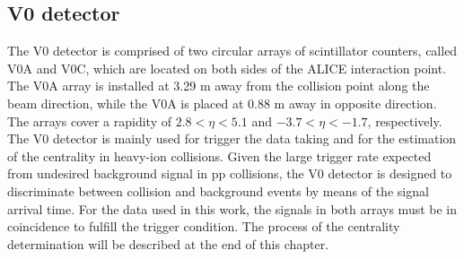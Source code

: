 \documentclass[12pt,a4paper]{report}
\begin{document}
\subsection{V0 detector}
The V0 detector is comprised of two circular arrays of scintillator counters, called V0A and V0C, which are located on both sides of the ALICE interaction point. The V0A array is installed at 3.29 m away from the collision point along the beam direction, while the V0A is placed at 0.88 m away in opposite direction. The arrays cover a rapidity of $2.8 < \eta < 5.1 $ and $-3.7 < \eta < -1.7 $, respectively. The V0 detector is mainly used for trigger the data taking and for the estimation of the centrality in heavy-ion collisions. Given the large trigger rate expected from undesired background signal in pp collisions, the V0 detector is designed to discriminate between collision and background events by means of the signal arrival time. For the data used in this work, the signals in both arrays must be in coincidence to fulfill the trigger condition. The process of the centrality determination will be described at the end of this chapter.
\end{document}
